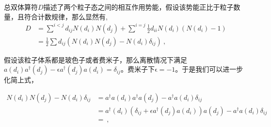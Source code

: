 总双体算符$D$描述了两个粒子态之间的相互作用势能，假设该势能正比于粒子数量，且符合计数规律，那么显然有,
\begin{equation}
\begin{aligned}
D&=\sum^{i<j}d_{ij}N(d_i)N(d_j)+\sum^{i=j}\frac{1}{2}d_{ii}N(d_i)(N(d_i)-1)\\
&=\frac{1}{2}\sum d_{ij}(N(d_i)N(d_j)-N(d_i)\delta_{ij})~,
\end{aligned}
\end{equation}

假设该粒子体系都是玻色子或者费米子，那么离散情况下满足$a(d_i)a^{\dagger}(d_j)-\mathrm{\epsilon}a^{\dagger}(d_j)a(d_i)=\delta_{ij}$。费米子下$\mathrm{\epsilon}=-1$。于是我们可以进一步化简上式，

\begin{equation}
\begin{aligned}
N(d_i)N(d_j)-N(d_i)\delta_{ij}&=a^\dagger a(d_i)a^\dagger a(d_j)-a^\dagger a(d_i)\delta_{ij}\\
&=a^\dagger (d_i)\left(\delta_{ij}+\epsilon a^{\dagger}(d_j)a(d_i)\right)a(d_j)-a^\dagger a(d_i)\delta_{ij}\\
&=~,
\end{aligned}
\end{equation}



